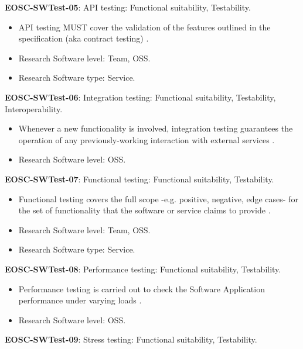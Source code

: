 \textbf{EOSC-SWTest-05}: API testing: Functional suitability, Testability.

\begin{itemize}
    \item API testing MUST cover the validation of the features outlined in the specification (aka contract testing) \cite{orviz_fernandez_eosc-synergy_2020}.
    \item Research Software level: Team, OSS.
    \item Research Software type: Service.
\end{itemize}

\textbf{EOSC-SWTest-06}: Integration testing: Functional suitability, Testability, Interoperability.

\begin{itemize}
    \item Whenever a new functionality is involved, integration testing guarantees the operation of any previously-working interaction with external services \cite{iso_25010_2011_2017,orviz_fernandez_eosc-synergy_2020}.
    \item Research Software level: OSS.
\end{itemize}

\textbf{EOSC-SWTest-07}: Functional testing: Functional suitability, Testability.

\begin{itemize}
    \item Functional testing covers the full scope -e.g. positive, negative, edge cases- for the set of functionality that the software or service claims to provide \cite{iso_25010_2011_2017,orviz_fernandez_eosc-synergy_2020}.
    \item Research Software level: Team, OSS.
    \item Research Software type: Service.
\end{itemize}

\textbf{EOSC-SWTest-08}: Performance testing: Functional suitability, Testability.

\begin{itemize}
    \item Performance testing is carried out to check the Software Application performance under varying loads \cite{iso_25010_2011_2017,orviz_fernandez_eosc-synergy_2020}.
    \item Research Software level: OSS.
\end{itemize}

\textbf{EOSC-SWTest-09}: Stress testing: Functional suitability, Testability.

